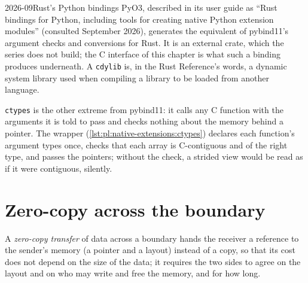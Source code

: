 \label{lst:pl:native-extensions:rust}

\begin{dated}{2026-09}{Rust's Python bindings}\label{dat:pl:native-extensions:pyo3}
PyO3, described in its user guide as ``Rust bindings for Python, including tools for creating native Python extension modules''
(consulted September 2026), generates the equivalent of pybind11's argument checks and conversions for Rust. It is an external crate,
which the series does not build; the C interface of this chapter is what such a binding produces underneath. A \texttt{cdylib} is, in
the Rust Reference's words, a dynamic system library used when compiling a library to be loaded from another language.
\end{dated}

\texttt{ctypes} is the other extreme from pybind11: it calls any C function with the arguments it is told to pass and checks nothing
about the memory behind a pointer. The wrapper (\cref{lst:pl:native-extensions:ctypes}) declares each function's argument types once,
checks that each array is C-contiguous and of the right type, and passes the pointers; without the check, a strided view would be read
as if it were contiguous, silently.

\label{lst:pl:native-extensions:ctypes}

\section{Zero-copy across the boundary}

\begin{definition}\label{def:pl:native-extensions:zerocopy}
A \emph{zero-copy transfer} of data across a boundary hands the receiver a reference to the sender's memory
(a pointer and a layout) instead of a copy, so that its cost does not depend on the size of the data; it requires the two sides to agree
on the layout and on who may write and free the memory, and for how long.
\end{definition}

